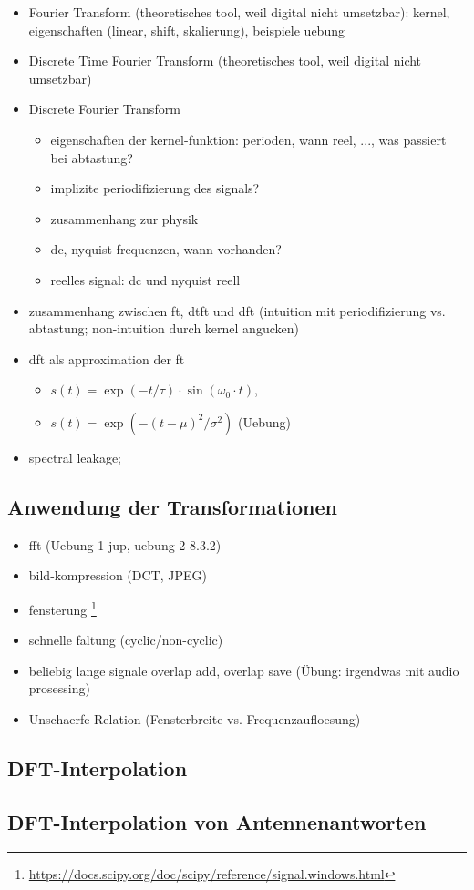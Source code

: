 \begin{itemize}
    \item Fourier Transform (theoretisches tool, weil digital nicht umsetzbar): kernel, eigenschaften (linear, shift, skalierung), beispiele uebung 
    \item Discrete Time Fourier Transform (theoretisches tool, weil digital nicht umsetzbar)
    \item Discrete Fourier Transform
    \begin{itemize}
        \item eigenschaften der kernel-funktion: perioden, wann reel, ..., was passiert bei abtastung?
        \item implizite periodifizierung des signals?
        \item zusammenhang zur physik
        \item dc, nyquist-frequenzen, wann vorhanden?
        \item reelles signal: dc und nyquist reell
    \end{itemize}
    \item zusammenhang zwischen ft, dtft und dft (intuition mit periodifizierung vs. abtastung; non-intuition durch kernel angucken)
    \item dft als approximation der ft
    \begin{itemize}
        \item $s(t) = \exp(-t/\tau) \cdot \sin(\omega_0 \cdot t)$, 
        \item $s(t) = \exp(-(t - \mu)^2/\sigma^2)$ (Uebung)
    \end{itemize}
    \item spectral leakage;
\end{itemize}
\subsection{Anwendung der Transformationen}
\begin{itemize}
    \item fft (Uebung 1 jup, uebung 2 8.3.2)
    \item bild-kompression (DCT, JPEG)
    \item fensterung \footnote{\url{https://docs.scipy.org/doc/scipy/reference/signal.windows.html}}
    \item schnelle faltung (cyclic/non-cyclic)
    \item beliebig lange signale overlap add, overlap save (\"Ubung: irgendwas mit audio prosessing)
    \item Unschaerfe Relation (Fensterbreite vs. Frequenzaufloesung)\cite[chpt. 4.2]{mallat2008wavelets}
\end{itemize}
%
%
\subsection{DFT-Interpolation}\label{dftintp}
%

%
%
\subsection{DFT-Interpolation von Antennenantworten}\label{eadf}
%
